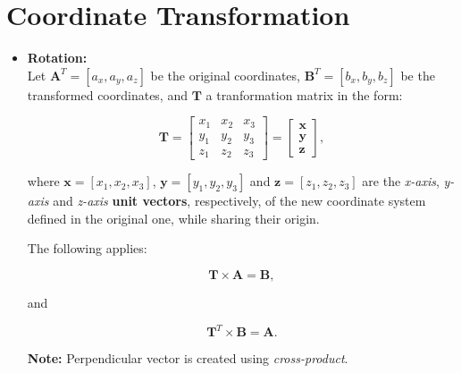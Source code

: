 \documentclass[10pt,b5paper,titlepage]{book}
\begin{document}
\section{Coordinate Transformation}

\begin{itemize}
    \item \textbf{Rotation:} \\

        Let $\mathbf{A}^{T} = [a_{x}, a_{y}, a_{z}]$ be the original coordinates,
        $\mathbf{B}^{T} = [b_{x}, b_{y}, b_{z}]$ be the transformed coordinates, and
        $\mathbf{T}$ a tranformation matrix in the form:

        \begin{equation}
            \mathbf{T} = \begin{bmatrix}
                x_1 & x_2 & x_3 \\
                y_1 & y_2 & y_3 \\
                z_1 & z_2 & z_3
            \end{bmatrix} = \begin{bmatrix}
                \mathbf{x} \\
                \mathbf{y} \\
                \mathbf{z}
            \end{bmatrix}
        ,\end{equation}

        where $\mathbf{x} = [x_1, x_2, x_3]$, $\mathbf{y} = [y_1, y_2, y_3]$ and
        $\mathbf{z} = [z_1, z_2, z_3]$ are the \textit{x-axis}, \textit{y-axis} and
        \textit{z-axis} \textbf{unit vectors}, respectively, of the new coordinate
        system defined in the original one, while sharing their origin.

        The following applies:

        \begin{equation}
            \mathbf{T} \times \mathbf{A} = \mathbf{B}
        ,\end{equation}

        and

        \begin{equation}
            \mathbf{T}^{T} \times \mathbf{B} = \mathbf{A}
        .\end{equation}

        \textbf{Note:} Perpendicular vector is  created using \textit{cross-product}.
\end{itemize}
\end{document}
